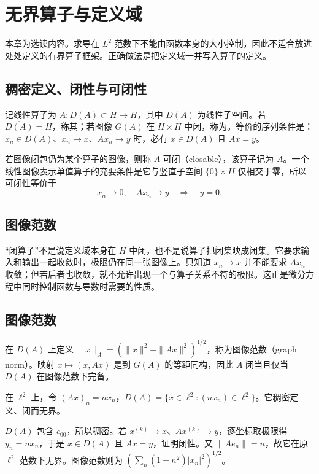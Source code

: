 \documentclass[UTF8,12pt,a4paper,fontset=fandol]{ctexbook}
\begin{document}
\chapter{无界算子与定义域}
\label{chap:fa-unbounded}

本章为选读内容。求导在 $L^2$ 范数下不能由函数本身的大小控制，因此不适合放进处处定义的有界算子框架。正确做法是把定义域一并写入算子的定义。

\section{稠密定义、闭性与可闭性}
记线性算子为 $A:D(A)\subset H\to H$，其中 $D(A)$ 为线性子空间。若 $\overline{D(A)}=H$，称其；若图像 $G(A)$ 在 $H\times H$ 中闭，称为。等价的序列条件是：$x_n\in D(A)$、$x_n\to x$、$Ax_n\to y$ 时，必有 $x\in D(A)$ 且 $Ax=y$。

若图像闭包仍为某个算子的图像，则称 $A$ 可闭（closable），该算子记为 $\overline A$。一个线性图像表示单值算子的充要条件是它与竖直子空间 $\{0\}\times H$ 仅相交于零，所以可闭性等价于
\[
 x_n\to0,\quad Ax_n\to y\quad\Longrightarrow\quad y=0.
\]

\section{图像范数}
“闭算子”不是说定义域本身在 $H$ 中闭，也不是说算子把闭集映成闭集。它要求输入和输出一起收敛时，极限仍在同一张图像上。只知道 $x_n\to x$ 并不能要求 $Ax_n$ 收敛；但若后者也收敛，就不允许出现一个与算子关系不符的极限。这正是微分方程中同时控制函数与导数时需要的性质。

\section{图像范数}
在 $D(A)$ 上定义 $\|x\|_A=(\|x\|^2+\|Ax\|^2)^{1/2}$，称为图像范数（graph norm）。映射 $x\mapsto(x,Ax)$ 是到 $G(A)$ 的等距同构，因此 $A$ 闭当且仅当 $D(A)$ 在图像范数下完备。

\begin{example}\label{ex:fa-unbounded-diagonal}
在 $\ell^2$ 上，令 $(Ax)_n=nx_n$，$D(A)=\{x\in\ell^2:(nx_n)\in\ell^2\}$。它稠密定义、闭而无界。
\end{example}
\begin{solve}
$D(A)$ 包含 $c_{00}$，所以稠密。若 $x^{(k)}\to x$、$Ax^{(k)}\to y$，逐坐标取极限得 $y_n=nx_n$，于是 $x\in D(A)$ 且 $Ax=y$，证明闭性。又 $\|Ae_n\|=n$，故它在原 $\ell^2$ 范数下无界。图像范数则为 $(\sum_n(1+n^2)|x_n|^2)^{1/2}$。
\end{solve}
\end{document}
